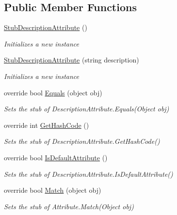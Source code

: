 \subsection*{Public Member Functions}
\begin{DoxyCompactItemize}
\item 
\hyperlink{class_system_1_1_component_model_1_1_fakes_1_1_stub_description_attribute_a08c566da38daf791dd725d4457ea8929}{Stub\-Description\-Attribute} ()
\begin{DoxyCompactList}\small\item\em Initializes a new instance\end{DoxyCompactList}\item 
\hyperlink{class_system_1_1_component_model_1_1_fakes_1_1_stub_description_attribute_a175bbaa47cc04f6b78e0ee2ab80b35c4}{Stub\-Description\-Attribute} (string description)
\begin{DoxyCompactList}\small\item\em Initializes a new instance\end{DoxyCompactList}\item 
override bool \hyperlink{class_system_1_1_component_model_1_1_fakes_1_1_stub_description_attribute_af282b388f505bc6a3ef050e8c6e0cbd2}{Equals} (object obj)
\begin{DoxyCompactList}\small\item\em Sets the stub of Description\-Attribute.\-Equals(\-Object obj)\end{DoxyCompactList}\item 
override int \hyperlink{class_system_1_1_component_model_1_1_fakes_1_1_stub_description_attribute_aa5064cc094aea12c820010742a799c8d}{Get\-Hash\-Code} ()
\begin{DoxyCompactList}\small\item\em Sets the stub of Description\-Attribute.\-Get\-Hash\-Code()\end{DoxyCompactList}\item 
override bool \hyperlink{class_system_1_1_component_model_1_1_fakes_1_1_stub_description_attribute_ac1acd1a893350873e9ee0946584f79ee}{Is\-Default\-Attribute} ()
\begin{DoxyCompactList}\small\item\em Sets the stub of Description\-Attribute.\-Is\-Default\-Attribute()\end{DoxyCompactList}\item 
override bool \hyperlink{class_system_1_1_component_model_1_1_fakes_1_1_stub_description_attribute_a40e2d65df215d3a187bba79bb93bc151}{Match} (object obj)
\begin{DoxyCompactList}\small\item\em Sets the stub of Attribute.\-Match(\-Object obj)\end{DoxyCompactList}\end{DoxyCompactItemize}
